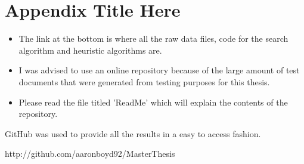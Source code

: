 
\chapter{Appendix Title Here} %

\label{AppendixA}
\begin{itemize}
\item The link at the bottom is where all the raw data files, code for the search algorithm and heuristic algorithms are.
\item I was advised to use an online repository because of the large amount of test documents that were generated from testing purposes for this thesis.
\item Please read the file titled 'ReadMe' which will explain the contents of the repository. 
\end{itemize}
GitHub was used to provide all the results in a easy to access fashion.

http://github.com/aaronboyd92/MasterThesis
